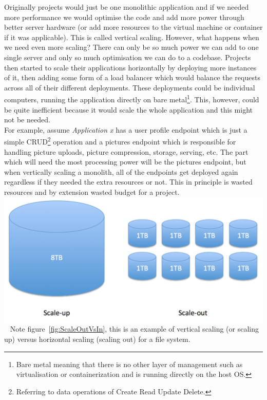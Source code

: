 \documentclass{article}
\begin{document}
\begin{multicols}{2}
Originally projects would just be one monolithic application and if we needed more performance we would optimise the code and add more power through better server hardware (or add more resources to the virtual machine or container if it was applicable). This is called vertical scaling. However, what happens when we need even more scaling? There can only be so much power we can add to one single server and only so much optimisation we can do to a codebase. Projects then started to scale their applications horizontally by deploying more instances of it, then adding some form of a load balancer which would balance the requests across all of their different deployments. These deployments could be individual computers, running the application directly on bare metal\footnote{Bare metal meaning that there is no other layer of management such as virtualisation or containerization and is running directly on the host OS.}. This, however, could be quite inefficient because it would scale the whole application and this might not be needed.\\
For example, assume \textit{Application x} has a user profile endpoint which is just a simple CRUD\footnote{Referring to data operations of Create Read Update Delete.} operation and a pictures endpoint which is responsible for handling picture uploads, picture compression, storage, serving, etc. The part which will need the most processing power will be the pictures endpoint, but when vertically scaling a monolith, all of the endpoints get deployed again regardless if they needed the extra resources or not. This in principle is wasted resources and by extension wasted budget for a project.\\

\begingroup
\centering
\includegraphics[width=0.9\linewidth]{./charts/Scale-up-vs-Scale-out.png}
~\label{fig:ScaleOutVsIn}
\endgroup
Note figure~\ref{fig:ScaleOutVsIn}, this is an example of vertical scaling (or scaling up) versus horizontal scaling (scaling out) for a file system. \\


\end{multicols}
\end{document}
